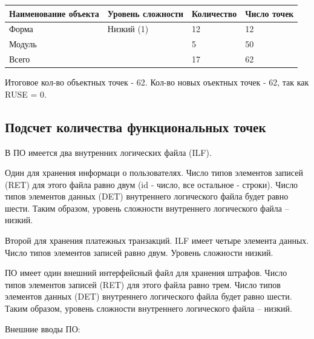 \documentclass[a4paper,14pt]{article}
\begin{document}
\begin{table}[H]
\begin{tabular}{|l|l|l|l|}
\hline
Наименование объекта & Уровень сложности & Количество & Число точек \\ \hline
Форма                & Низкий (1)        & 12          & 12           \\ \hline
Модуль               &                   & 5          & 50          \\ \hline
Всего                &                   & 17         & 62          \\ \hline
\end{tabular}
\end{table}

Итоговое кол-во объектных точек - 62. Кол-во новых оъектных точек - 62, так как RUSE = 0.

\subsection*{Подсчет количества функциональных точек}

В  ПО имеется  два  внутренних  логических  файла  (ILF). 

Один для хранения  информаци о пользователях. Число типов элементов записей (RET) для этого файла равно двум (id - число, все остальное - строки). Число  типов  элементов  данных  (DET)  внутреннего  логического файла  будет  равно шести. Таким  образом,  уровень  сложности  внутреннего логического файла – низкий.

Второй для хранения  платежных транзакций. ILF имеет четыре элемента данных. Число типов элементов записей равно двум. Уровень сложности низкий.

ПО имеет один внешний интерфейсный файл для хранения штрафов. Число типов элементов записей (RET) для этого файла равно трем. Число  типов  элементов  данных  (DET)  внутреннего  логического файла  будет  равно шести. Таким  образом,  уровень  сложности  внутреннего логического файла – низкий.

Внешние вводы ПО:
\end{document}
